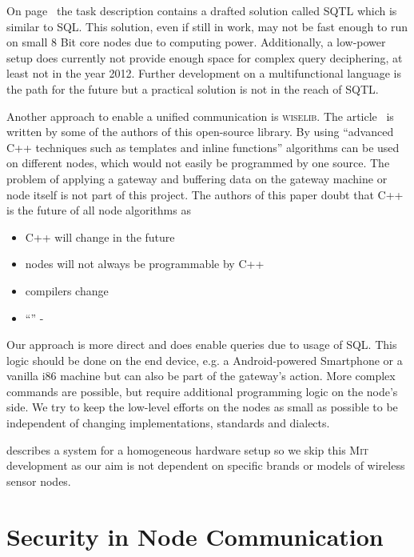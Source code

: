 On page~\pageref{chap:unify} the task description contains a drafted solution called \textsc{SQTL} which is similar to \textsc{SQL}. This
solution, even if still in work, may not be fast enough to run on small 8 Bit core nodes due to computing power. Additionally, a low-power 
setup does currently not provide enough space for complex query deciphering, at least not in the year 2012. Further development on a 
multifunctional language is the path for the future but a practical solution is not in the reach of \textsc{SQTL}.

Another approach to enable a unified communication is \textsc{wiselib}. The article~\cite{wiselib} is written by some of the authors of this
open-source library. By using ``advanced C++ techniques such as templates and inline functions'' algorithms can be used on different nodes,
which would not easily be programmed by one source. The problem of applying a gateway and buffering data on the gateway machine or node itself
is not part of this project. The authors of this paper doubt that C++ is the future of all node algorithms as

\begin{itemize}
    \item C++ will change in the future
    \item nodes will not always be programmable by C++
    \item compilers change
    \item ``'' - 
\end{itemize}

Our approach is more direct and does enable queries due to usage of \textsc{SQL}. 
This logic should be done on the end device, e.g. a Android-powered Smartphone or a 
vanilla i86 machine but can also be part of the gateway's action. 
More complex commands are possible, but require additional programming logic on the node's side. We try to 
keep the low-level efforts on the nodes as small as possible to be independent of changing implementations, standards and dialects.

\cite{Heinzelman00energy-efficientcommunication} describes a system for a homogeneous hardware setup so we skip this \textsc{Mit} development as 
our aim is not dependent on specific brands or models of wireless sensor nodes.

\section{Security in Node Communication}

